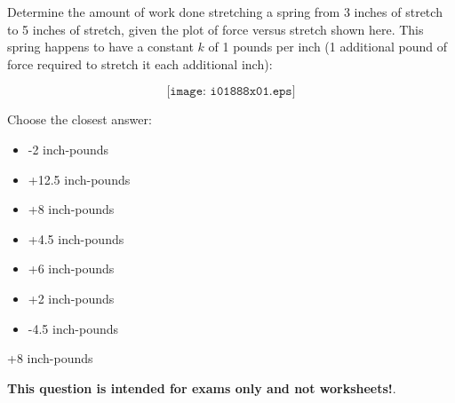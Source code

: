 

Determine the amount of work done stretching a spring from 3 inches of stretch to 5 inches of stretch, given the plot of force versus stretch shown here.  This spring happens to have a constant $k$ of 1 pounds per inch (1 additional pound of force required to stretch it each additional inch):

$$\texttt{[image: i01888x01.eps]}$$

Choose the closest answer:

\begin{itemize}
\item{} -2 inch-pounds
\vskip 10pt 
\item{} +12.5 inch-pounds
\vskip 10pt 
\item{} +8 inch-pounds
\vskip 10pt 
\item{} +4.5 inch-pounds
\vskip 10pt 
\item{} +6 inch-pounds
\vskip 10pt 
\item{} +2 inch-pounds
\vskip 10pt 
\item{} -4.5 inch-pounds
\end{itemize}







+8 inch-pounds






{\bf This question is intended for exams only and not worksheets!}.



